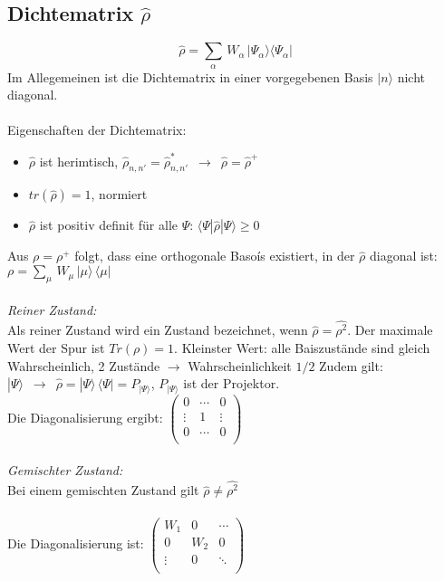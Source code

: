 \documentclass[a4paper,11pt]{scrartcl}
\begin{document}
\subsection{Dichtematrix $\hat{\rho}$ }
\begin{equation}
 \hat{\rho} = \sum_{\alpha} \, W_{\alpha} \, | \Psi_{\alpha} \rangle \langle \Psi_{\alpha} |
\end{equation}
Im Allegemeinen ist die Dichtematrix in einer vorgegebenen Basis $|n \rangle$ nicht diagonal.\\
\\
Eigenschaften der Dichtematrix: \\
\begin{itemize}
 \item $\hat{\rho}$ ist herimtisch, $ \hat{\rho}_{n,n'} = \hat{\rho}_{n,n'}^* \,\,\, \rightarrow \,\,\, \hat{\rho} = \hat{\rho}^+$
 \item $tr(\hat{\rho}) = 1$, normiert
 \item $\hat{\rho}$ ist positiv definit für alle $\Psi$: $\langle \Psi | \hat{\rho} | \Psi \rangle \geq 0$
\end{itemize}
Aus $\rho = \rho^+$ folgt, dass eine orthogonale Basoís existiert, in der $\hat{\rho}$ diagonal ist: $\rho = \sum_{\mu}\, W_{\mu} \, | \mu \rangle \, \langle \mu |$\\
\\
\textit{Reiner Zustand:} \\
Als reiner Zustand wird ein Zustand bezeichnet, wenn $\hat{\rho} = \hat{\rho^2}$. Der maximale Wert der Spur ist $Tr(\rho) = 1$. Kleinster Wert: alle Baiszustände sind gleich Wahrscheinlich, 2 Zustände $\rightarrow$ Wahrscheinlichkeit $1/2$
Zudem gilt: $ | \Psi \rangle \,\,\, \rightarrow \,\,\, \hat{\rho} = | \Psi \rangle  \, \langle  \Psi |  = P_{| \Psi \rangle}$, $P_{| \Psi \rangle}$ ist der Projektor.\\
Die Diagonalisierung ergibt: 
$\left( \begin{array}{rrr}
0 & \cdots & 0 \\
\vdots & 1 & \vdots  \\
0 & \cdots & 0  \\
\end{array}\right) $
\\
\\
\textit{Gemischter Zustand:} \\
Bei einem gemischten Zustand gilt $\hat{\rho} \neq \hat{\rho^2}$ \\
\\
Die Diagonalisierung ist: 
$\left( \begin{array}{rrr}
W_1 & 0 & \cdots \\
0 & W_2 & 0  \\
\vdots & 0 & \ddots  \\
\end{array}\right) $\\
\end{document}
